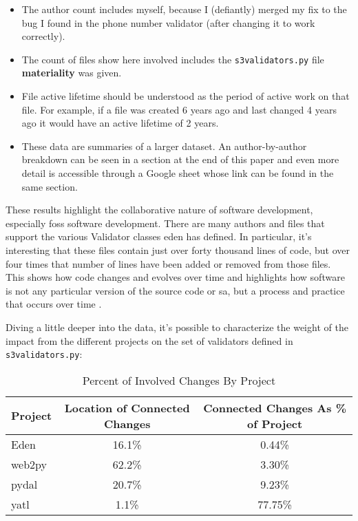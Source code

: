 \documentclass[a4paper,man,natbib,floatsintext]{apa6}
\begin{document}
  \begin{itemize}
    \item The author count includes myself, because I (defiantly) merged my fix to the bug I found in the phone number validator (after changing it to work correctly).
    \item The count of files show here involved includes the \verb|s3validators.py| file \textbf{materiality} was given. 
    \item File active lifetime should be understood as the period of active work on that file. For example, if a file was created 6 years ago and last changed 4 years ago it would have an active lifetime of 2 years.
    \item These data are summaries of a larger dataset. An author-by-author breakdown can be seen in a section at the end of this paper and even more detail is accessible through a Google sheet whose link can be found in the same section.
  \end{itemize}
  
  These results highlight the collaborative nature of software development, especially \acrshort{foss} software development. There are many authors and files that support the various Validator classes \acrshort{eden} has defined. In particular, it's interesting that these files contain just over forty thousand lines of code, but over four times that number of lines have been added or removed from those files. This shows how code changes and evolves over time and highlights how software is not any particular version of the source code or \gls{sa}, but a process and practice that occurs over time \citep{Mackenzie2006-hb}.  

  Diving a little deeper into the data, it's possible to characterize the weight of the impact from the different projects on the set of validators defined in \verb|s3validators.py|:

  \begin{table}[ht]
  \caption{Percent of Involved Changes By Project}
  \label{tab:change-locations}
  \begin{tabular}{|l|c|c|}
\hline
\textbf{Project} & \textbf{Location of Connected Changes} & \textbf{Connected Changes As \% of Project} \\ \hline
Eden                  & 16.1\%                                       & 0.44\%                           \\ \hline
web2py                & 62.2\%                                       & 3.30\%                           \\ \hline
pydal                 & 20.7\%                                       & 9.23\%                           \\ \hline
yatl                  & 1.1\%                                        & 77.75\%                          \\ \hline
\end{tabular}
\end{table}
\end{document}
